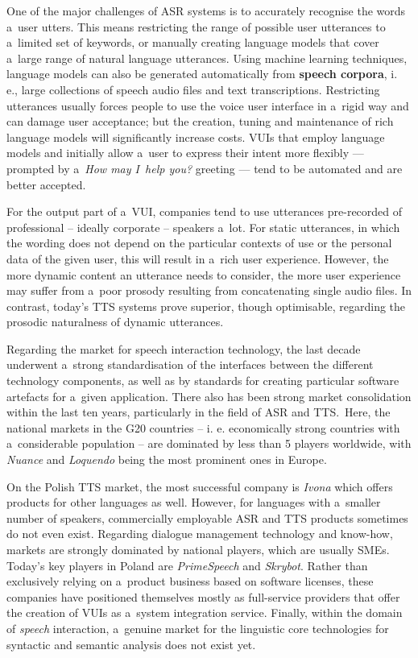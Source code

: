 \begin{multicols}{2}
One of the major challenges of ASR systems is to accurately recognise
the words a~user utters. This means restricting the range of possible
user utterances to a~limited set of keywords, or manually creating
language models that cover a~large range of natural language
utterances. Using machine learning techniques, language models can
also be generated automatically from \textbf{speech corpora}, i.\, e.,
large collections of speech audio files and text transcriptions.
Restricting utterances usually forces people to use the voice user
interface in a~rigid way and can damage user acceptance; but the
creation, tuning and maintenance of rich language models will
significantly increase costs. VUIs that employ language models and
initially allow a~user to express their intent more flexibly —
prompted by a~\textit{How may I~help you?} greeting — tend to be
automated and are better accepted. 

For the output part of a~VUI, companies tend to use utterances pre-recorded of professional – ideally corporate – speakers a~lot.
For static utterances, in which the wording does not depend on the
particular contexts of use or the personal data of the given user,
this will result in a~rich user experience. However, the more dynamic
content an utterance needs to consider, the more user experience may
suffer from a~poor prosody resulting from concatenating single audio
files. In contrast, today’s TTS systems prove superior, though
optimisable, regarding the prosodic naturalness of dynamic utterances.

Regarding the market for speech interaction technology, the last
decade underwent a~strong standardisation of the interfaces between
the different technology components, as well as by standards for
creating particular software artefacts for a~given application. There
also has been strong market consolidation within the last ten years,
particularly in the field of ASR and TTS.~Here, the national markets
in the G20 countries -- i. e. economically strong countries with
a~considerable population -- are dominated by less than 5 players
worldwide, with \textit{Nuance} and \textit{Loquendo} being the most
prominent ones in Europe. 


On the Polish TTS market, the most successful company is \textit{Ivona
}which offers products for other languages as well. However, for
languages with a~smaller number of speakers, commercially employable
ASR and TTS products sometimes do not even exist. Regarding dialogue
management technology and know-how, markets are strongly dominated by
national players, which are usually SMEs. Today’s key players in
Poland are \textit{PrimeSpeech} and \textit{Skrybot}. Rather than
exclusively relying on a~product business based on software licenses,
these companies have positioned themselves mostly as full-service
providers that offer the creation of VUIs as a~system integration
service. Finally, within the domain of \textit{speech} interaction,
a~genuine market for the linguistic core technologies for syntactic
and semantic analysis does not exist yet. 


\end{multicols}
